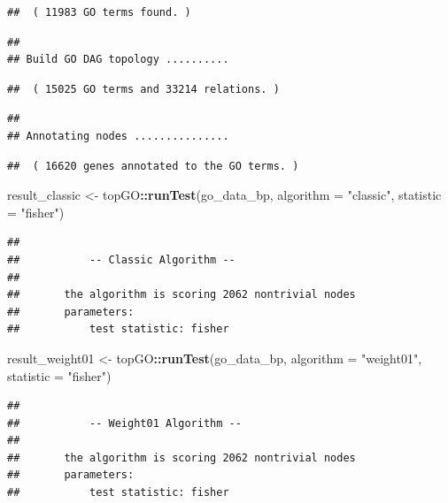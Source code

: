 \documentclass[
]{article}
\newenvironment{Shaded}{\begin{snugshade}}{\end{snugshade}}
\newcommand{\AttributeTok}[1]{\textcolor[rgb]{0.13,0.29,0.53}{#1}}
\newcommand{\FunctionTok}[1]{\textcolor[rgb]{0.13,0.29,0.53}{\textbf{#1}}}
\newcommand{\NormalTok}[1]{#1}
\newcommand{\OtherTok}[1]{\textcolor[rgb]{0.56,0.35,0.01}{#1}}
\newcommand{\SpecialCharTok}[1]{\textcolor[rgb]{0.81,0.36,0.00}{\textbf{#1}}}
\newcommand{\StringTok}[1]{\textcolor[rgb]{0.31,0.60,0.02}{#1}}
\begin{document}
\begin{verbatim}
##  ( 11983 GO terms found. )
\end{verbatim}

\begin{verbatim}
## 
## Build GO DAG topology ..........
\end{verbatim}

\begin{verbatim}
##  ( 15025 GO terms and 33214 relations. )
\end{verbatim}

\begin{verbatim}
## 
## Annotating nodes ...............
\end{verbatim}

\begin{verbatim}
##  ( 16620 genes annotated to the GO terms. )
\end{verbatim}

\begin{Shaded}
\begin{Highlighting}[]
\NormalTok{result\_classic }\OtherTok{\textless{}{-}}\NormalTok{ topGO}\SpecialCharTok{::}\FunctionTok{runTest}\NormalTok{(go\_data\_bp, }\AttributeTok{algorithm =} \StringTok{"classic"}\NormalTok{, }\AttributeTok{statistic =} \StringTok{"fisher"}\NormalTok{)}
\end{Highlighting}
\end{Shaded}

\begin{verbatim}
## 
##           -- Classic Algorithm -- 
## 
##       the algorithm is scoring 2062 nontrivial nodes
##       parameters: 
##           test statistic: fisher
\end{verbatim}

\begin{Shaded}
\begin{Highlighting}[]
\NormalTok{result\_weight01 }\OtherTok{\textless{}{-}}\NormalTok{ topGO}\SpecialCharTok{::}\FunctionTok{runTest}\NormalTok{(go\_data\_bp, }\AttributeTok{algorithm =} \StringTok{"weight01"}\NormalTok{, }\AttributeTok{statistic =} \StringTok{"fisher"}\NormalTok{)}
\end{Highlighting}
\end{Shaded}

\begin{verbatim}
## 
##           -- Weight01 Algorithm -- 
## 
##       the algorithm is scoring 2062 nontrivial nodes
##       parameters: 
##           test statistic: fisher
\end{verbatim}
\end{document}
